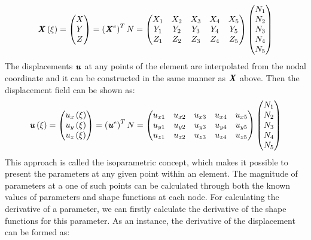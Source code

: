 \begin{equation}
\textbf{\textit{X}}  \left(\xi\right) = \begin{pmatrix}
X \\
Y \\
Z
\end{pmatrix} = \left(\textbf{\textit{X}}^e\right)^T N = \begin{pmatrix}
X_1 & X_2 & X_3 & X_4 & X_5 \\
Y_1 & Y_2 & Y_3 & Y_4 & Y_5 \\
Z_1 & Z_2 & Z_3 & Z_4 & Z_5
\end{pmatrix} \begin{pmatrix}
N_1 \\
N_2 \\
N_3 \\
N_4 \\
N_5 
\end{pmatrix}
\end{equation} 
The displacements $\textbf{\textit{u}}$ at any points of the element are interpolated from the nodal coordinate and it can be constructed in the same manner as  $\textbf{\textit{X}}$ above. Then the displacement field can be shown as:
\begin{equation}
\textbf{\textit{u}}\left(\xi\right) = \begin{pmatrix}
u_x\left(\xi\right) \\
u_y\left(\xi\right) \\
u_z\left(\xi\right) 
\end{pmatrix} = \left(\textbf{\textit{u}}^e\right)^T N = \begin{pmatrix}
u_{x1} & u_{x2} & u_{x3} & u_{x4} & u_{x5} \\
u_{y1} & u_{y2} & u_{y3} & u_{y4} & u_{y5} \\
u_{z1} & u_{z2} & u_{z3} & u_{z4} & u_{z5}
\end{pmatrix} \begin{pmatrix}
N_1 \\
N_2 \\
N_3 \\
N_4 \\
N_5 
\end{pmatrix}
\end{equation}
This approach is called the isoparametric concept, which makes it possible to present  the parameters at any given point within an element. The magnitude of parameters at a one of such points can be calculated through both the known values of parameters and shape functions at each node. For calculating the derivative of a parameter, we can firstly calculate the derivative of the shape functions for this parameter. As an instance, the derivative of the displacement can be formed as: 
